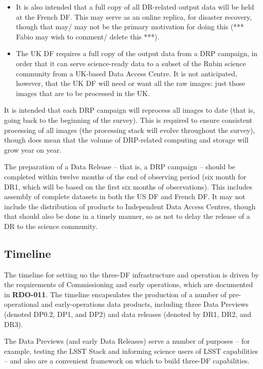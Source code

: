\begin{itemize}

  \item It is also intended that a full copy of all DR-related output data will be held at the French DF. This may serve as an online replica, for disaster recovery, though that may/ may not be the primary motivation for doing this (*** Fabio may wish to comment/ delete this ***).

  \item The UK DF requires a full copy of the output data from a DRP campaign, in order that it can serve science-ready data to a subset of the Rubin science community from a UK-based Data Access Centre. It is not anticipated, however, that the UK DF will need or want all the raw images: just those images that are to be processed in the UK.
    
\end{itemize}

It is intended that each DRP campaign will reprocess all images to date (that is, going back to the beginning of the survey). This is required to ensure consistent processing of all images (the processing stack will evolve throughout the survey), though does mean that the volume of DRP-related computing and storage will grow year on year.

The preparation of a Data Release – that is, a DRP campaign – should be completed within twelve months of the end of observing period (six month for DR1, which will be based on the first six months of observations). This includes assembly of complete datasets in both the US DF and French DF. It may not include the distribution of products to Independent Data Access Centres, though that should also be done in a timely manner, so as not to delay the release of a DR to the science community.

\subsection{Timeline}

The timeline for setting uo the three-DF infrastructure and operation is driven by the requirements of Commissioning and early operations, which are documented in {\bf RDO-011}. The timeline encapsulates the production of a number of pre-operational and early-operations data products, including three Data Previews (denoted DP0.2, DP1, and DP2) and data releases (denoted by DR1, DR2, and DR3).

The Data Previews (and early Data Releases) serve a number of purposes -- for example, testing the LSST Stack and informing science users of LSST capabilities -- and also are a convenient framework on which to build three-DF capabilities.

